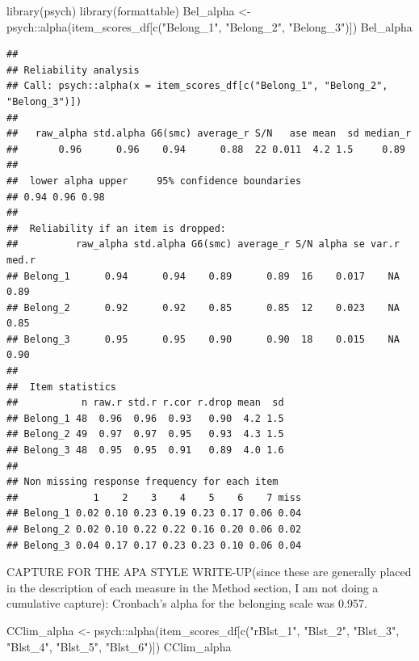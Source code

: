 \documentclass[
]{book}
\newenvironment{Shaded}{\begin{snugshade}}{\end{snugshade}}
\newcommand{\FunctionTok}[1]{\textcolor[rgb]{0.00,0.00,0.00}{#1}}
\newcommand{\NormalTok}[1]{#1}
\newcommand{\OtherTok}[1]{\textcolor[rgb]{0.56,0.35,0.01}{#1}}
\newcommand{\SpecialCharTok}[1]{\textcolor[rgb]{0.00,0.00,0.00}{#1}}
\newcommand{\StringTok}[1]{\textcolor[rgb]{0.31,0.60,0.02}{#1}}
\begin{document}
\begin{Shaded}
\begin{Highlighting}[]
\FunctionTok{library}\NormalTok{(psych)}
\FunctionTok{library}\NormalTok{(formattable)}
\NormalTok{Bel\_alpha }\OtherTok{\textless{}{-}}\NormalTok{ psych}\SpecialCharTok{::}\FunctionTok{alpha}\NormalTok{(item\_scores\_df[}\FunctionTok{c}\NormalTok{(}\StringTok{"Belong\_1"}\NormalTok{, }\StringTok{"Belong\_2"}\NormalTok{, }\StringTok{"Belong\_3"}\NormalTok{)])}
\NormalTok{Bel\_alpha}
\end{Highlighting}
\end{Shaded}

\begin{verbatim}
## 
## Reliability analysis   
## Call: psych::alpha(x = item_scores_df[c("Belong_1", "Belong_2", "Belong_3")])
## 
##   raw_alpha std.alpha G6(smc) average_r S/N   ase mean  sd median_r
##       0.96      0.96    0.94      0.88  22 0.011  4.2 1.5     0.89
## 
##  lower alpha upper     95% confidence boundaries
## 0.94 0.96 0.98 
## 
##  Reliability if an item is dropped:
##          raw_alpha std.alpha G6(smc) average_r S/N alpha se var.r med.r
## Belong_1      0.94      0.94    0.89      0.89  16    0.017    NA  0.89
## Belong_2      0.92      0.92    0.85      0.85  12    0.023    NA  0.85
## Belong_3      0.95      0.95    0.90      0.90  18    0.015    NA  0.90
## 
##  Item statistics 
##           n raw.r std.r r.cor r.drop mean  sd
## Belong_1 48  0.96  0.96  0.93   0.90  4.2 1.5
## Belong_2 49  0.97  0.97  0.95   0.93  4.3 1.5
## Belong_3 48  0.95  0.95  0.91   0.89  4.0 1.6
## 
## Non missing response frequency for each item
##             1    2    3    4    5    6    7 miss
## Belong_1 0.02 0.10 0.23 0.19 0.23 0.17 0.06 0.04
## Belong_2 0.02 0.10 0.22 0.22 0.16 0.20 0.06 0.02
## Belong_3 0.04 0.17 0.17 0.23 0.23 0.10 0.06 0.04
\end{verbatim}

CAPTURE FOR THE APA STYLE WRITE-UP(since these are generally placed in the description of each measure in the Method section, I am not doing a cumulative capture): Cronbach's alpha for the belonging scale was 0.957.

\begin{Shaded}
\begin{Highlighting}[]
\NormalTok{CClim\_alpha }\OtherTok{\textless{}{-}}\NormalTok{ psych}\SpecialCharTok{::}\FunctionTok{alpha}\NormalTok{(item\_scores\_df[}\FunctionTok{c}\NormalTok{(}\StringTok{"rBlst\_1"}\NormalTok{, }\StringTok{"Blst\_2"}\NormalTok{, }\StringTok{"Blst\_3"}\NormalTok{, }\StringTok{"Blst\_4"}\NormalTok{, }\StringTok{"Blst\_5"}\NormalTok{, }\StringTok{"Blst\_6"}\NormalTok{)])}
\NormalTok{CClim\_alpha}
\end{Highlighting}
\end{Shaded}
\end{document}
